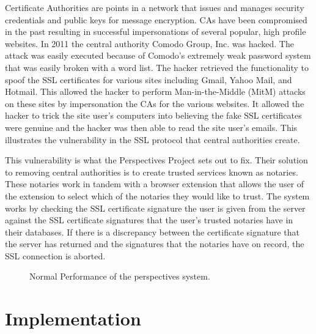 \documentclass[preprint,review,12pt]{elsarticle}
\begin{document}
Certificate Authorities are points in a network that issues and manages
security credentials and public keys for message encryption. CAs have been
compromised in the past resulting in successful impersonations of several
popular, high profile websites.  In 2011 the central authority Comodo Group,
Inc. was hacked. The attack was easily executed because of Comodo's extremely
weak password system that was easily broken with a word list. The hacker
retrieved the functionality to spoof the SSL certificates for various sites
including Gmail, Yahoo Mail, and Hotmail.  \citep{comodohack} This allowed the
hacker to perform Man-in-the-Middle (MitM) attacks on these sites by
impersonation the CAs for the various websites. It allowed the hacker to trick
the site user's computers into believing the fake SSL certificates were genuine
and the hacker was then able to read the site user's emails.  This illustrates
the vulnerability in the SSL protocol that central authorities create.

This vulnerability is what the Perspectives Project sets out to fix. Their
solution to removing central authorities is to create trusted services known as
notaries. These notaries work in tandem with a browser extension that allows
the user of the extension to select which of the notaries they would like to
trust. The system works by checking the SSL certificate signature the user is
given from the server against the SSL certificate signatures that the user's
trusted notaries have in their databases. If there is a discrepancy between the
certificate signature that the server has returned and the signatures that the
notaries have on record, the SSL connection is aborted.

\begin{figure}[h]
\caption{Normal Performance of the perspectives system.}
\end{figure}

\section{Implementation}
\label{implementation}
\end{document}
